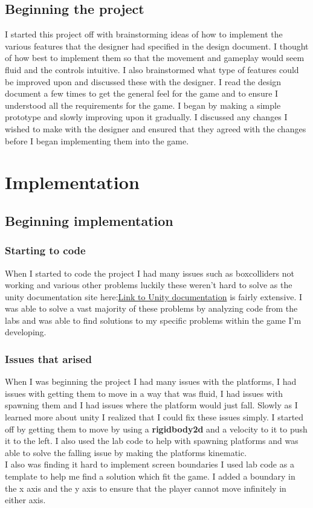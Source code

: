 \documentclass{report}
\begin{document}
\section{Beginning the project}
I started this project off with brainstorming ideas of how to implement the various features that the designer had specified in the design document. I thought of how best to implement them so that the movement and gameplay would seem fluid and the controls intuitive. I also brainstormed what type of features could be improved upon and discussed these with the designer. I read the design document a few times to get the general feel for the game and to ensure I understood all the requirements for the game.  I began by making a simple prototype and slowly improving upon it gradually.  I discussed any changes I wished to make with the designer and ensured that they agreed with the changes before I began implementing them into the game.
\chapter{Implementation}
\section{Beginning implementation}
\subsection{Starting to code}
When I started to code the project I had many issues such as boxcolliders not working and various other problems luckily these weren't  hard to solve as the unity documentation site here:\href{https://docs.unity3d.com/Manual/index.html}{Link to Unity documentation} is fairly extensive.  I was able to solve a vast majority of these problems by analyzing code from the labs and was able to find solutions to my specific problems within the game I'm developing. 
\subsection{Issues that arised}
When I was beginning the project I had many issues with the platforms, I had issues with getting them to move in a way that was fluid, I had issues with spawning them and I had issues where the platform would just fall.  Slowly as I learned more about unity I realized that I could fix these issues simply. I started off by getting them to move by using a \textbf{rigidbody2d}\cite{RigidBody} and a velocity to it to push it to the left. I also used the lab code to help with spawning platforms and was able to solve the falling issue by making the platforms kinematic.
\\
I also was finding it hard to implement screen boundaries I used lab code as a template to help me find a solution which fit the game.  I added a boundary in the x axis and the y axis to ensure that the player cannot move infinitely in either axis.
\end{document}
